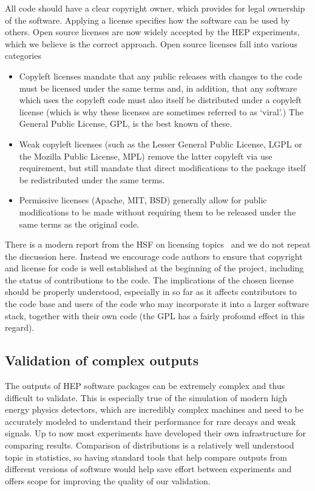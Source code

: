 \documentclass[12pt,a4paper]{article}
\begin{document}
All code should have a clear copyright owner, which provides for legal
ownership of the software. Applying a license specifies how the software
can be used by others. Open source licenses are now widely accepted by
the HEP experiments, which we believe is the correct approach. Open
source licenses fall into various categories

\begin{itemize}
\item
    Copyleft licenses mandate that any public releases with changes to the
  code must be licensed under the same terms and, in addition, that any
  software which uses the copyleft code must also itself be distributed
  under a copyleft license (which is why these licenses are sometimes
  referred to as `viral'.) The General Public License, GPL, is the best
  known of these.
  \item
    Weak copyleft licenses (such as the Lesser General Public License,
  LGPL or the Mozilla Public License, MPL) remove the latter copyleft
  via use requirement, but still mandate that direct modifications to
  the package itself be redistributed under the same terms.
  \item
    Permissive licenses (Apache, MIT, BSD) generally allow for public
  modifications to be made without requiring them to be released under
  the same terms as the original code.
\end{itemize}

There is a modern report from the HSF on licensing 
topics~\cite{HSF-TN-2016-01} and we do not
repeat the discussion here. Instead we encourage code authors to ensure
that copyright and license for code is well established at the beginning
of the project, including the status of contributions to the code. The
implications of the chosen license should be properly understood,
especially in so far as it affects contributors to the code base and
users of the code who may incorporate it into a larger software stack,
together with their own code (the GPL has a fairly profound effect in
this regard).

\hypertarget{validation-of-complex-outputs}{%
\subsection{Validation of complex
outputs}\label{validation-of-complex-outputs}}

The outputs of HEP software packages can be extremely complex and thus
difficult to validate. This is especially true of the simulation of
modern high energy physics detectors, which are incredibly complex
machines and need to be accurately modeled to understand their
performance for rare decays and weak signals. Up to now most experiments
have developed their own infrastructure for comparing results.
Comparison of distributions is a relatively well understood topic in
statistics, so having standard tools that help compare outputs from
different versions of software would help save effort between
experiments and offers scope for improving the quality of our
validation.
\end{document}
